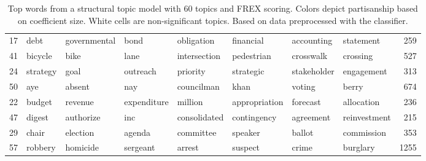\begin{table}[ht]
\begin{tabular}{rlllllllr}
   17 & \cellcolor{blue!10}debt & \cellcolor{blue!10}governmental & \cellcolor{blue!10}bond & \cellcolor{blue!10}obligation & \cellcolor{blue!10}financial & \cellcolor{blue!10}accounting & \cellcolor{blue!10}statement & 259 \\ 
   41 & \cellcolor{blue!10}bicycle & \cellcolor{blue!10}bike & \cellcolor{blue!10}lane & \cellcolor{blue!10}intersection & \cellcolor{blue!10}pedestrian & \cellcolor{blue!10}crosswalk & \cellcolor{blue!10}crossing & 527 \\ 
   24 & \cellcolor{blue!10}strategy & \cellcolor{blue!10}goal & \cellcolor{blue!10}outreach & \cellcolor{blue!10}priority & \cellcolor{blue!10}strategic & \cellcolor{blue!10}stakeholder & \cellcolor{blue!10}engagement & 313 \\ 
   50 & \cellcolor{blue!20}aye & \cellcolor{blue!20}absent & \cellcolor{blue!20}nay & \cellcolor{blue!20}councilman & \cellcolor{blue!20}khan & \cellcolor{blue!20}voting & \cellcolor{blue!20}berry & 674 \\ 
   22 & \cellcolor{blue!20}budget & \cellcolor{blue!20}revenue & \cellcolor{blue!20}expenditure & \cellcolor{blue!20}million & \cellcolor{blue!20}appropriation & \cellcolor{blue!20}forecast & \cellcolor{blue!20}allocation & 236 \\ 
   47 & \cellcolor{blue!20}digest & \cellcolor{blue!20}authorize & \cellcolor{blue!20}inc & \cellcolor{blue!20}consolidated & \cellcolor{blue!20}contingency & \cellcolor{blue!20}agreement & \cellcolor{blue!20}reinvestment & 215 \\ 
   29 & \cellcolor{blue!20}chair & \cellcolor{blue!20}election & \cellcolor{blue!20}agenda & \cellcolor{blue!20}committee & \cellcolor{blue!20}speaker & \cellcolor{blue!20}ballot & \cellcolor{blue!20}commission & 353 \\ 
   57 & \cellcolor{blue!80}robbery & \cellcolor{blue!80}homicide & \cellcolor{blue!80}sergeant & \cellcolor{blue!80}arrest & \cellcolor{blue!80}suspect & \cellcolor{blue!80}crime & \cellcolor{blue!80}burglary & 1255 \\ 
   \hline
\end{tabular}
\endgroup
\caption{Top words from a structural topic model with 60 topics and FREX scoring. Colors depict partisanship based on coefficient size. White cells are non-significant topics. Based on data preprocessed with the classifier.} 
\end{table}

